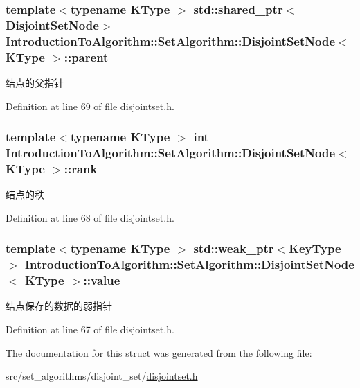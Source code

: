 \subsubsection[{parent}]{\setlength{\rightskip}{0pt plus 5cm}template$<$typename K\+Type $>$ std\+::shared\+\_\+ptr$<${\bf Disjoint\+Set\+Node}$>$ {\bf Introduction\+To\+Algorithm\+::\+Set\+Algorithm\+::\+Disjoint\+Set\+Node}$<$ K\+Type $>$\+::parent}\label{struct_introduction_to_algorithm_1_1_set_algorithm_1_1_disjoint_set_node_ad5cf3f4d739ecd0c1f6d3b3005e21993}
结点的父指针 

Definition at line 69 of file disjointset.\+h.

\hypertarget{struct_introduction_to_algorithm_1_1_set_algorithm_1_1_disjoint_set_node_a1fd137f74ca1317bfb02d9e1640ce147}{}
\subsubsection[{rank}]{\setlength{\rightskip}{0pt plus 5cm}template$<$typename K\+Type $>$ int {\bf Introduction\+To\+Algorithm\+::\+Set\+Algorithm\+::\+Disjoint\+Set\+Node}$<$ K\+Type $>$\+::rank}\label{struct_introduction_to_algorithm_1_1_set_algorithm_1_1_disjoint_set_node_a1fd137f74ca1317bfb02d9e1640ce147}
结点的秩 

Definition at line 68 of file disjointset.\+h.

\hypertarget{struct_introduction_to_algorithm_1_1_set_algorithm_1_1_disjoint_set_node_ae01535aa5e8ba05dceedd5c475d61c18}{}
\subsubsection[{value}]{\setlength{\rightskip}{0pt plus 5cm}template$<$typename K\+Type $>$ std\+::weak\+\_\+ptr$<${\bf Key\+Type}$>$ {\bf Introduction\+To\+Algorithm\+::\+Set\+Algorithm\+::\+Disjoint\+Set\+Node}$<$ K\+Type $>$\+::value}\label{struct_introduction_to_algorithm_1_1_set_algorithm_1_1_disjoint_set_node_ae01535aa5e8ba05dceedd5c475d61c18}
结点保存的数据的弱指针 

Definition at line 67 of file disjointset.\+h.



The documentation for this struct was generated from the following file\+:\begin{DoxyCompactItemize}
\item 
src/set\+\_\+algorithms/disjoint\+\_\+set/\hyperlink{disjointset_8h}{disjointset.\+h}\end{DoxyCompactItemize}
